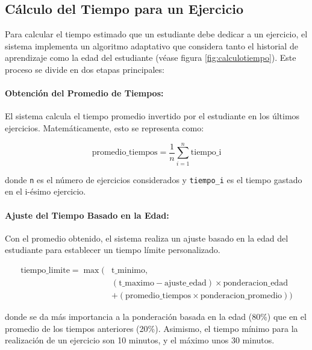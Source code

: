 \subsection{Cálculo del Tiempo para un Ejercicio}

Para calcular el tiempo estimado que un estudiante debe dedicar a un ejercicio, el sistema implementa un algoritmo adaptativo que considera tanto el historial de aprendizaje como la edad del estudiante (véase figura \ref{fig:calculotiempo}). Este proceso se divide en dos etapas principales:


\paragraph{Obtención del Promedio de Tiempos:} El sistema calcula el tiempo promedio invertido por el estudiante en los últimos ejercicios. Matemáticamente, esto se representa como:

\begin{equation} 
    \text{promedio\_tiempos} = \frac{1}{n} \sum_{i=1}^{n} \text{tiempo\_i}
\end{equation}
    
donde \texttt{n} es el número de ejercicios considerados y \texttt{tiempo\_i} es el tiempo gastado en el i-ésimo ejercicio.

\paragraph{Ajuste del Tiempo Basado en la Edad:} Con el promedio obtenido, el sistema realiza un ajuste basado en la edad del estudiante para establecer un tiempo límite personalizado. 

\begin{equation}
    \begin{split}
        \text{tiempo\_limite} = \max\Bigg( & \text{t\_minimo}, \\
        & \left( \text{t\_maximo} - \text{ajuste\_edad} \right) \times \text{ponderacion\_edad} \\
        & + \left( \text{promedio\_tiempos} \times \text{ponderacion\_promedio} \right) \Bigg)
    \end{split}
\end{equation}
    
donde se da más importancia a la ponderación basada en la edad (80\%) que en el promedio de los tiempos anteriores (20\%). Asimismo, el tiempo mínimo para la realización de un ejercicio son 10 minutos, y el máximo unos 30 minutos.

